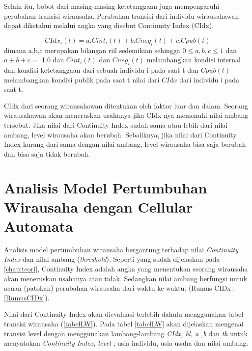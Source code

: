 Selain itu, bobot dari masing-masing ketetanggaan juga mempengaruhi perubahan transisi wirausaha. Perubahan transisi dari individu wirausahawan dapat diketahui melalui angka yang disebut Continuity Index (CIdx).

\begin{displaymath}
\label{RumusCIDx}
	CIdx_{i}(t) = a.Cint_{i}(t) + b.Cneg_{i}(t) + c.Cpub(t)
\end{displaymath}
dimana a,b,c merupakan bilangan riil sedemikian sehingga $0\leq a,b,c \leq 1$ dan $a+b+c=$ 1.0 dan $Cint_{i}(t)$ dan $Cneg_{i}(t)$ melambangkan kondisi internal dan kondisi ketetanggaan dari sebuah individu i pada saat t dan $Cpub(t)$ melambangkan kondisi publik pada saat t nilai dari $CIdx$ dari individu i pada saat t.

CIdx dari seorang wirausahawan ditentukan oleh faktor luar dan dalam. Seorang wirausahawan akan meneruskan usahanya jika CIdx nya memenuhi nilai ambang tersebut. Jika nilai dari Continuity Index sudah sama atau lebih dari nilai ambang, level wirausaha akan berubah. Sebaliknya, jika nilai dari Continuity Index kurang dari sama dengan nilai ambang, level wirausaha bisa saja berubah dan bisa saja tidak berubah.

\section{Analisis Model Pertumbuhan Wirausaha dengan Cellular Automata}
\label{analisismodelCA}

Analisis model pertumbuhan wirausaha bergantung terhadap nilai \textit{Continuity Index} dan nilai ambang (\textit{threshold}). Seperti yang sudah dijelaskan pada \ref{chap:teori}, Continuity Index adalah angka yang menentukan seorang wirausaha akan meneruskan usahanya atau tidak. Sedangkan nilai ambang berfungsi untuk acuan (patokan) perubahan wirausaha dari waktu ke waktu. (Rumus CIDx : \ref{RumusCIDx}).


Nilai dari Continuity Index akan dievaluasi terlebih dahulu menggunakan tabel transisi wirausaha (\ref{tabelLW}). Pada tabel \ref{tabelLW} akan dijelaskan mengenai transisi level dengan menggunakan lambang-lambang \textit{CIdx, bl, a ,b} dan \textit{th} untuk menyatakan \textit{Continuity Index, level} , usia individu, usia usaha dan nilai ambang.


